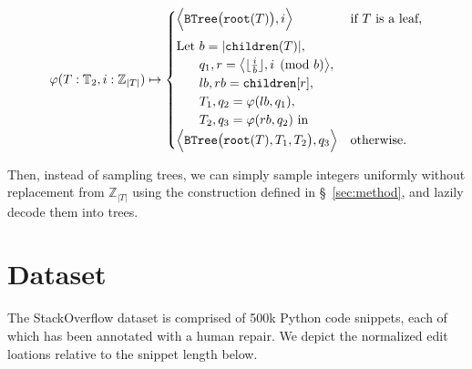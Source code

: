 \documentclass[sigplan,review,anonymous,acmsmall]{acmart}\settopmatter{printfolios=false,printccs=false,printacmref=false}
\begin{document}
\begin{small}
\begin{equation*}
  \varphi(T: \mathbb{T}_2, i: \mathbb{Z}_{|T|}) \mapsto \begin{cases}
  \Big\langle\texttt{BTree}\big(\texttt{root}(T)\big), i\Big\rangle & \text{if $T$ is a leaf,} \vspace{5pt}\\
  \text{Let } b = |\texttt{children}(T)|,\\
  \phantom{\text{Let }} q_1, r=\big\langle\lfloor\frac{i}{b}\rfloor, i \pmod{b}\big\rangle,\\
  \phantom{\text{Let }} lb, rb = \texttt{children}[r],\\
  \phantom{\text{Let }} T_1, q_2 = \varphi(lb, q_1),\\
  \phantom{\text{Let }} T_2, q_3 = \varphi(rb, q_2) \text{ in } \\
  \Big\langle\texttt{BTree}\big(\texttt{root}(T), T_1, T_2\big), q_3\Big\rangle & \text{otherwise.} \\
  \end{cases}
\end{equation*}
\end{small}

Then, instead of sampling trees, we can simply sample integers uniformly without replacement from $\mathbb{Z}_{|T|}$ using the construction defined in \S~\ref{sec:method}, and lazily decode them into trees.

  \section{Dataset}

  The StackOverflow dataset is comprised of 500k Python code snippets, each of which has been annotated with a human repair. We depict the normalized edit loations relative to the snippet length below.

  \begin{figure}
  \end{figure}
\end{document}
